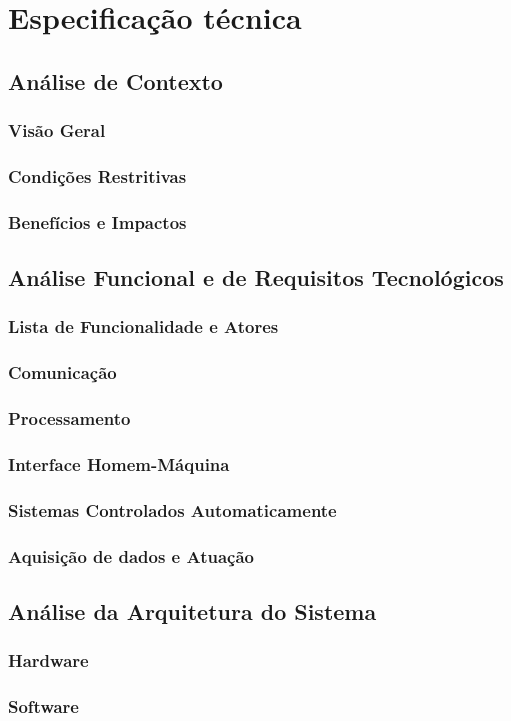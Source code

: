     \chapter{Especificação técnica} \label{cap:especificacao_tecnica}

\section{Análise de Contexto}
\subsection{Visão Geral}
\subsection{Condições Restritivas}
\subsection{Benefícios e Impactos}

\section{Análise Funcional e de Requisitos Tecnológicos}
\subsection{Lista de Funcionalidade e Atores}
\subsection{Comunicação}
\subsection{Processamento}
\subsection{Interface Homem-Máquina}
\subsection{Sistemas Controlados Automaticamente}
\subsection{Aquisição de dados e Atuação}

\section{Análise da Arquitetura do Sistema}
\subsection{Hardware}
\subsection{Software}

